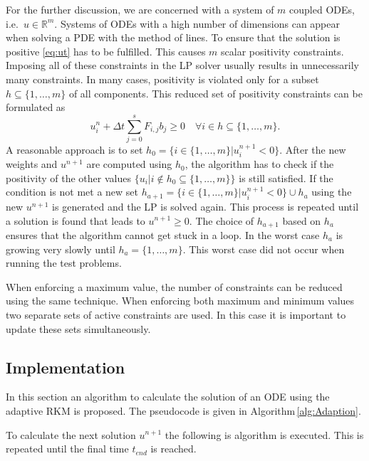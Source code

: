 \documentclass[a4paper]{article}
\numberwithin{equation}{section}
\theoremstyle{plain}
\theoremstyle{definition}
\numberwithin{theorem}{section}
\newcommand{\R}{\mathbb{R}}
\newcommand{\dt}{{\Delta t}}
\newcommand{\1}{\mathbbm{1}}
\begin{document}
For the further discussion, we are concerned with a system of
$m$ coupled ODEs, i.e.\ $u \in \R^m$.
Systems of ODEs with a high number of dimensions can appear when solving a PDE with the method of lines.
To ensure that the solution is positive \eqref{eq:ut} has to be fulfilled.
This causes $m$ scalar positivity constraints.
Imposing all of these constraints in the LP solver usually results
in unnecessarily many constraints. In many cases, positivity is
violated only for a subset $h \subseteq \{1, \dots, m\}$ of all
components. This reduced set of positivity constraints can be
formulated as
\begin{equation}
u_i^n + \dt \sum_{j=0}^s F_{i,j}  b_j  \geq 0 \quad \forall i \in h \subseteq \{1,\dots,m \}.
\end{equation}
A reasonable approach is to set $h_0 = \{ i \in \{1,\dots,m \} |  u_i^{n+1}  < 0 \}$.
After the new weights and $u^{n+1}$ are computed using $h_0$, the algorithm has to check if the positivity of the other values $\{u_i | i \notin h_0 \subseteq \{1,\dots,m \}\}$ is still satisfied.
If the condition is not met a new set $h_{a+1} = \{ i \in \{1,\dots,m \}|  u_i^{n+1}  < 0 \} \cup h_{a}$ using the new $u^{n+1}$ is generated and the LP is solved again. This process is repeated until a solution is found that leads to $u^{n+1} \geq 0$. The choice of $h_{a+1}$ based on $h_{a}$ ensures that the algorithm cannot get stuck in a loop. In the worst case $h_a$ is growing very slowly until $h_a = \{1,\dots,m \}$.
This worst case did not occur when running the test problems.

When enforcing a maximum value, the number of constraints can be reduced using the same technique. When enforcing both maximum and minimum values two separate sets of active constraints are used.
In this case it is important to update these sets simultaneously.

\subsection{Implementation}

In this section an algorithm to calculate the solution of an ODE using the adaptive RKM is proposed.
The pseudocode is given in Algorithm\,\ref{alg:Adaption}.

To calculate the next solution $u^{n+1}$ the following is algorithm is executed. This is repeated until the final time $t_{end}$ is reached.
\end{document}
